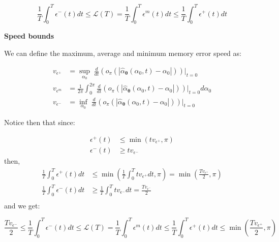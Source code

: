 \documentclass{article} %
\theoremstyle{definition}
\theoremstyle{remark}
\begin{document}
\begin{equation}
    \frac{1}{T} \int_0^{T} \epsilon^-(t)dt \leq \mathcal{L}(T) = \frac{1}{T} \int_0^{T} \epsilon^{m}(t) dt \leq  \frac{1}{T} \int_0^{T} \epsilon^+(t) dt
\end{equation}


\textbf{Speed bounds}

We can define the maximum, average and minimum memory error speed as:

\begin{equation}
\begin{split}
    v_{\epsilon^+} &= \sup_{\alpha_0} \; \frac{d}{dt} (o_\pi \left( \left| \hat{\alpha}_{\boldsymbol{\theta}}(\alpha_0, t) - \alpha_0  \right| \right)) |_{t = 0}  \\
    v_{\epsilon^m} &= \frac{1}{2 \pi} \int_0^{2 \pi} \frac{d}{dt} (o_\pi \left( \left| \hat{\alpha}_{\boldsymbol{\theta}}(\alpha_0, t) - \alpha_0  \right| \right))|_{t = 0} d\alpha_0 \\
    v_{\epsilon^-} &= \inf_{\alpha_0} \; \frac{d}{dt} (o_\pi \left( \left| \hat{\alpha}_{\boldsymbol{\theta}}(\alpha_0, t) - \alpha_0  \right| \right))|_{t = 0}
\end{split}
\end{equation}

Notice then that since:

\begin{equation}
\begin{split}
    \epsilon^+(t) &\leq \min(t v_{\epsilon^+}, \pi) \\
    \epsilon^-(t) &\geq t v_{\epsilon^-}
\end{split}
\end{equation}
then,
\begin{equation}
\begin{split}
    \frac{1}{T} \int_0^{T} \epsilon^+(t)dt &\leq  \min \left( \frac{1}{T} \int_0^{T} t v_{\epsilon^+} dt, \pi \right) = \min \left( \frac{T v_{\epsilon^+}}{2}, \pi \right) \\
    \frac{1}{T} \int_0^{T} \epsilon^-(t)dt &\geq  \frac{1}{T} \int_0^{T} tv_{\epsilon^-}dt  = \frac{T v_{\epsilon^-}}{2} \\
\end{split}
\end{equation}
and we get:

\begin{equation}
    \frac{T v_{\epsilon^-}}{2} \leq \frac{1}{T} \int_0^{T} \epsilon^-(t)dt \leq \mathcal{L}(T) = \frac{1}{T} \int_0^{T} \epsilon^{m}(t) dt \leq  \frac{1}{T} \int_0^{T} \epsilon^+(t) dt \leq \min \left( \frac{T v_{\epsilon^+}}{2}, \pi \right)
\end{equation}
\end{document}
